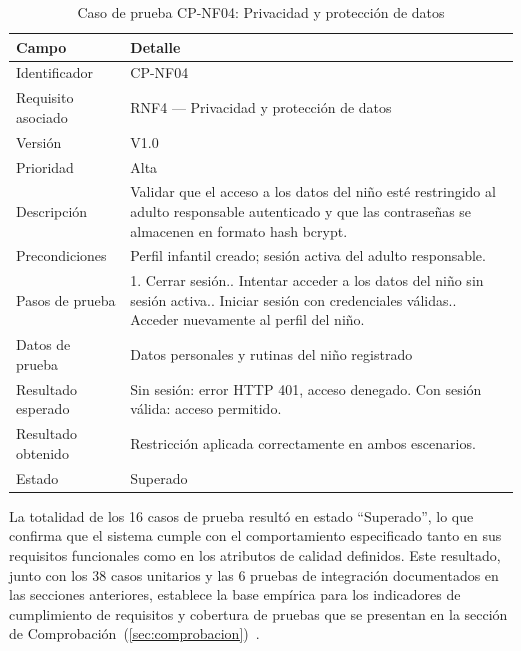 				\begin{table}[H]
					\centering\small
					\caption{Caso de prueba CP-NF04: Privacidad y protección de datos}
					\label{tab:cpnf04}
					\begin{tabular}{p{3cm}p{12.0cm}}
						\hline
						\textbf{Campo} & \textbf{Detalle}\\
						\hline
						Identificador & CP-NF04\\
						Requisito asociado & RNF4 --- Privacidad y protección de datos\\
						Versión & V1.0\\
						Prioridad & Alta\\
						Descripción & Validar que el acceso a los datos del niño esté restringido al adulto responsable autenticado y que las contraseñas se almacenen en formato hash bcrypt.\\
						Precondiciones & Perfil infantil creado; sesión activa del adulto responsable.\\
						Pasos de prueba & 1. Cerrar sesión.\newline 2. Intentar acceder a los datos del niño sin sesión activa.\newline 3. Iniciar sesión con credenciales válidas.\newline 4. Acceder nuevamente al perfil del niño.\\
						Datos de prueba & Datos personales y rutinas del niño registrado\\
						Resultado esperado & Sin sesión: error HTTP 401, acceso denegado. Con sesión válida: acceso permitido.\\
						Resultado obtenido & Restricción aplicada correctamente en ambos escenarios.\\
						Estado & Superado\\
						\hline
					\end{tabular}
				\end{table}
				\tblnote
				
				La totalidad de los 16 casos de prueba resultó en estado ``Superado'', lo que confirma que el sistema cumple con el comportamiento especificado tanto en sus requisitos funcionales como en los atributos de calidad definidos. Este resultado, junto con los 38 casos unitarios y las 6 pruebas de integración documentados en las secciones anteriores, establece la base empírica para los indicadores de cumplimiento de requisitos y cobertura de pruebas que se presentan en la sección de Comprobación~(\ref{sec:comprobacion})~\cite{GuerreroUlloa2024}.
				
